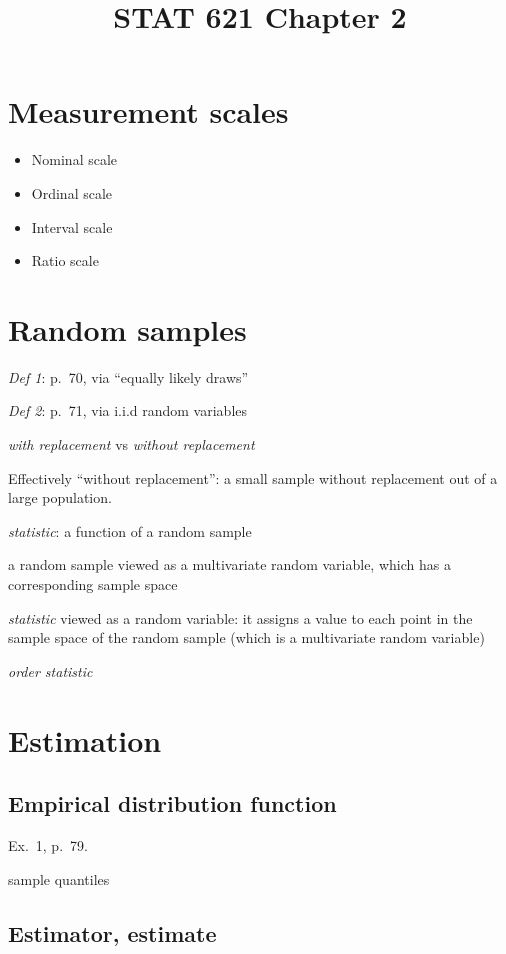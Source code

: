 \documentclass[12pt]{article}
\begin{document}
\title{STAT 621 Chapter 2}
\maketitle


\section{Measurement scales}

\begin{itemize}
\item Nominal scale
\item Ordinal scale
\item Interval scale
\item Ratio scale
\end{itemize}

\section{Random samples}

\emph{Def 1}: p.~70, via ``equally likely draws''

\emph{Def 2}: p.~71, via i.i.d random variables

\emph{with replacement} vs \emph{without replacement}

Effectively ``without replacement'':
a small sample without replacement out of a large population.

\emph{statistic}: a function of a random sample

a random sample viewed as a multivariate random variable,
which has a corresponding sample space

\emph{statistic} viewed as a random variable:
it assigns a value to each point in the sample space
of the random sample (which is a multivariate random variable)

\emph{order statistic}

\section{Estimation}

\subsection{Empirical distribution function}

\example Ex.~1, p.~79.

sample quantiles

\subsection{Estimator, estimate}
\end{document}
